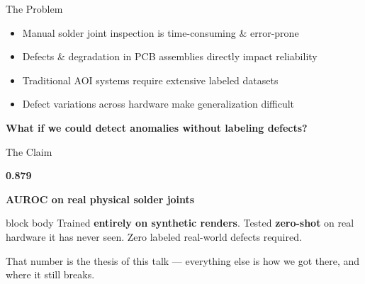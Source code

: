 \documentclass[aspectratio=169, 11pt]{beamer}
\newcommand{\emphred}[1]{\textcolor{secondary}{#1}}
\newcommand{\emphhighlight}[1]{\textcolor{primary}{\textbf{#1}}}
\begin{document}
\begin{frame}{\emphred{The Problem}}
    \vspace{0.5cm}
    \begin{itemize}
        \item Manual solder joint inspection is \emphred{time-consuming \& error-prone}
        \item Defects \& degradation in PCB assemblies directly impact reliability
        \item Traditional AOI systems require \emphred{extensive labeled datasets}
        \item Defect variations across hardware make generalization \emphred{difficult}
    \end{itemize}

    \vspace{1cm}
    \begin{center}
        \textbf{\large What if we could detect anomalies without labeling defects?}
    \end{center}
\end{frame}

\begin{frame}{\emphred{The Claim}}
    \vspace{0.3cm}
    \begin{center}
        {\fontsize{60}{64}\selectfont\bfseries\color{accent} 0.879}

        {\Large\bfseries AUROC on real physical solder joints}

        \vspace{0.6cm}

        \begin{beamercolorbox}[wd=0.85\paperwidth,rounded=true,shadow=true,sep=0.8em]{block body}
            \large Trained \emphhighlight{entirely on synthetic renders}. Tested \emphhighlight{zero-shot} on real hardware it has never seen. \emphred{Zero labeled real-world defects required.}
        \end{beamercolorbox}
    \end{center}

    \vspace{0.6cm}
    \begin{center}
        \small That number is the thesis of this talk --- everything else is how we got there, and where it still breaks.
    \end{center}
\end{frame}
\end{document}
